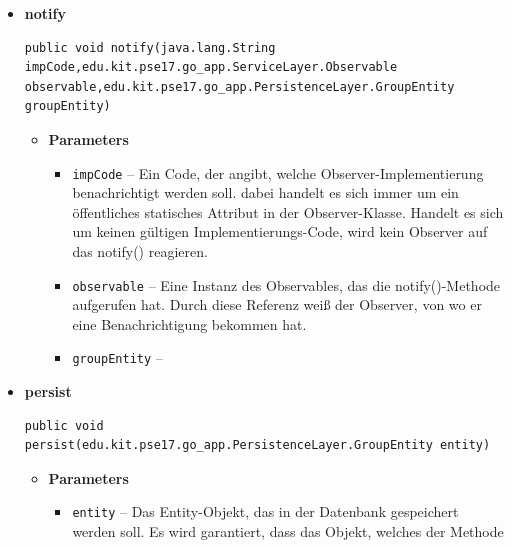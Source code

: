 \documentclass[11pt,a4paper]{article}
\begin{document}
{{{{{{{{{{{{{{\begin{itemize}
{\begin{itemize}
{}%
\end{itemize}
}%
\item{ 
\hypertarget{edu.kit.pse17.go_app.PersistenceLayer.daos.GroupDaoImp.notify(java.lang.String, edu.kit.pse17.go_app.ServiceLayer.Observable, edu.kit.pse17.go_app.PersistenceLayer.GroupEntity)}{{\bf  notify}\\}
\begin{lstlisting}[frame=none]
public void notify(java.lang.String impCode,edu.kit.pse17.go_app.ServiceLayer.Observable observable,edu.kit.pse17.go_app.PersistenceLayer.GroupEntity groupEntity)\end{lstlisting} %
\begin{itemize}
\item{
{\bf  Parameters}
  \begin{itemize}
   \item{
\texttt{impCode} -- Ein Code, der angibt, welche Observer-Implementierung benachrichtigt werden soll. dabei handelt es sich immer um ein öffentliches statisches Attribut in der Observer-Klasse. Handelt es sich um keinen gültigen Implementierungs-Code, wird kein Observer auf das notify() reagieren.}
   \item{
\texttt{observable} -- Eine Instanz des Observables, das die notify()-Methode aufgerufen hat. Durch diese Referenz weiß der Observer, von wo er eine Benachrichtigung bekommen hat.}
   \item{
\texttt{groupEntity} -- }
  \end{itemize}
}%
\end{itemize}
}%
\item{ 
\hypertarget{edu.kit.pse17.go_app.PersistenceLayer.daos.GroupDaoImp.persist(edu.kit.pse17.go_app.PersistenceLayer.GroupEntity)}{{\bf  persist}\\}
\begin{lstlisting}[frame=none]
public void persist(edu.kit.pse17.go_app.PersistenceLayer.GroupEntity entity)\end{lstlisting} %
\begin{itemize}
\item{
{\bf  Parameters}
  \begin{itemize}
   \item{
\texttt{entity} -- Das Entity-Objekt, das in der Datenbank gespeichert werden soll. Es wird garantiert, dass das Objekt, welches der Methode}
  \end{itemize}
}
\end{itemize}}
\end{itemize}}}}}}}}}}}}}}}
\end{document}
